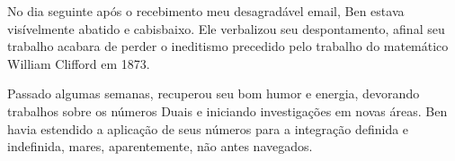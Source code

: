 \documentclass{article}
\begin{document}
No dia seguinte após o recebimento meu desagradável email, Ben estava visívelmente abatido e cabisbaixo. Ele verbalizou seu despontamento, afinal seu trabalho acabara de perder o ineditismo precedido pelo trabalho do matemático William Clifford em 1873.

Passado algumas semanas, recuperou seu bom humor e energia, devorando trabalhos sobre os números Duais e iniciando investigações em novas áreas. Ben havia estendido a aplicação de seus números para a integração definida e indefinida, mares, aparentemente, não antes navegados.
\end{document}
